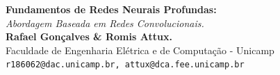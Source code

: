 \documentclass[a0,portrait]{a0poster}
\begin{document}
    \noindent
\begin{minipage}{0.73\linewidth}
\veryHuge \color{Indigo} \textbf{Fundamentos de Redes Neurais Profundas:}\\ \color{Black}
\LARGE\textit{Abordagem Baseada em Redes Convolucionais.}\\[1cm] %
\LARGE \textbf{Rafael Gonçalves \& Romis Attux.}\\[0.2cm] %
    {\LARGE Faculdade de Engenharia Elétrica e de Computação - Unicamp\\
    \texttt{r186062@dac.unicamp.br, attux@dca.fee.unicamp.br}}
\end{minipage}
%
\begin{minipage}{0.27\linewidth}
    \centering
    \vspace{2cm}
    \def\svgwidth{0.6\columnwidth}
    
    \break\hfill\break
\end{minipage}

\vspace{1cm} %
\end{document}
